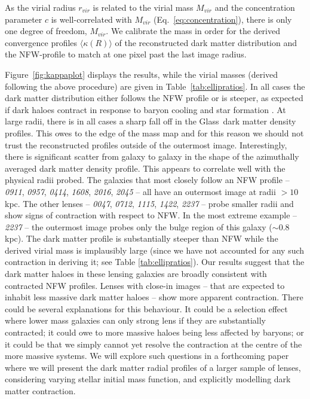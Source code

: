\documentclass[useAMS,usenatbib]{mn2e}
\def\Glass{{\sc Glass}}
\begin{document}
As the virial radius $r_{vir}$ is related to the virial mass $M_{vir}$ and the concentration parameter $c$ is well-correlated with $M_{vir}$ (Eq.~\ref{eq:concentration}), there is only one degree of freedom, $M_{vir}$. We calibrate the mass in order for the derived convergence profiles $\langle\kappa(R)\rangle$ of the reconstructed dark matter distribution and the NFW-profile to match at one pixel past the last image radius.

Figure~\ref{fig:kappaplot} displays the results, while the virial masses (derived following the above procedure) are given in Table~\ref{tab:ellipratios}. In all cases the dark matter distribution either follows the NFW profile or is steeper, as expected if dark haloes contract in response to baryon cooling and star formation \citep[e.g.][]{1991ApJ...377..365K,1994ApJ...431..617D,2007arXiv0707.0737D}. At large radii, there is in all cases a sharp fall off in the \Glass\ dark matter density profiles. This owes to the edge of the mass map and for this reason we should not trust the reconstructed profiles outside of the outermost image. Interestingly, there is significant scatter from galaxy to galaxy in the shape of the azimuthally averaged dark matter density profile. This appears to correlate well with the physical radii probed. The galaxies that most closely follow an NFW profile -- \textit{0911}, \textit{0957}, \textit{0414}, \textit{1608}, \textit{2016}, \textit{2045} -- all have an outermost image at radii $> 10$\,kpc. The other lenses -- \textit{0047}, \textit{0712}, \textit{1115}, \textit{1422}, \textit{2237} -- probe smaller radii and show signs of contraction with respect to NFW. In the most extreme example -- \textit{2237} -- the outermost image probes only the bulge region of this galaxy ($\sim 0.8$\,kpc). The dark matter profile is substantially steeper than NFW while the derived virial mass is implausibly large (since we have not accounted for any such contraction in deriving it; see Table \ref{tab:ellipratios}). Our results suggest that the dark matter haloes in these lensing galaxies are broadly consistent with contracted NFW profiles. Lenses with close-in images -- that are expected to inhabit less massive dark matter haloes -- show more apparent contraction. There could be several explanations for this behaviour. It could be a selection effect where lower mass galaxies can only strong lens if they are substantially contracted; it could owe to more massive haloes being less affected by baryons; or it could be that we simply cannot yet resolve the contraction at the centre of the more massive systems. We will explore such questions in a forthcoming paper where we will present the dark matter radial profiles of a larger sample of lenses, considering varying stellar initial mass function, and explicitly modelling dark matter contraction.
\end{document}
